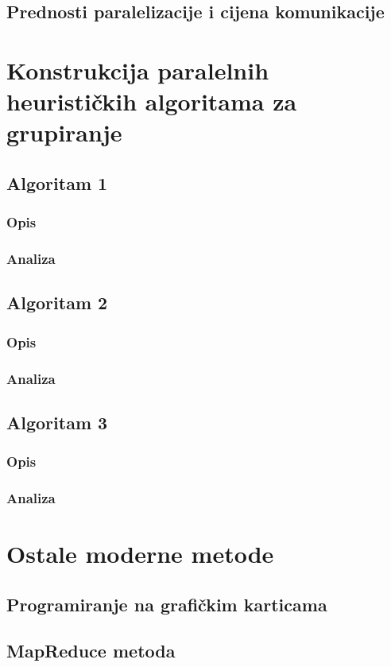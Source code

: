 \documentclass[a4paper,twoside,12pt]{memoir} %
\begin{document}
\section[Prednosti paralelizacije i cijena komunikacije][pred-man-paralel]{Prednosti paralelizacije i cijena komunikacije}
\chapter{Konstrukcija paralelnih heurističkih algoritama za grupiranje}
\section{Algoritam 1}
\subsection{Opis}
\subsection{Analiza}
\section{Algoritam 2}
\subsection{Opis}
\subsection{Analiza}
\section{Algoritam 3}
\subsection{Opis}
\subsection{Analiza}
\chapter{Ostale moderne metode}
\section{Programiranje na grafičkim karticama}
\section{MapReduce metoda}
\end{document}
